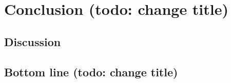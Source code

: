\chapter{Conclusion (todo: change title)}
\label{chap:conclusion}

\section{Discussion}
\label{sec:discussion}

\section{Bottom line (todo: change title)}
\label{sec:bottom_line}

